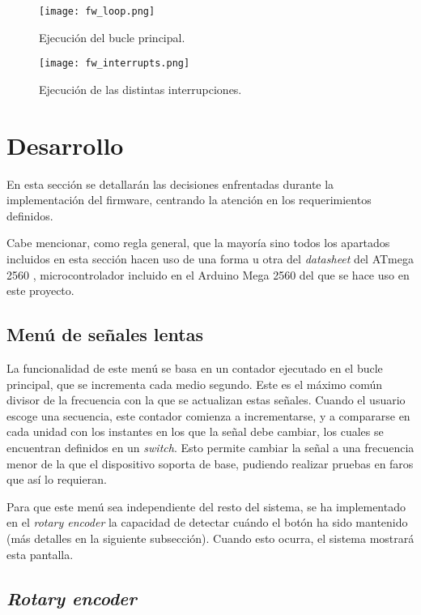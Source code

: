 \begin{figure}[h!]
    \centering
    \texttt{[image: fw\_loop.png]}
    \caption{Ejecución del bucle principal.}
    \label{fig:fw_loop}
\end{figure}

\begin{figure}[h!]
    \centering
    \texttt{[image: fw\_interrupts.png]}
    \caption{Ejecución de las distintas interrupciones.}
    \label{fig:fw_interrupts}
\end{figure}

\section{Desarrollo}

En esta sección se detallarán las decisiones enfrentadas durante la implementación del firmware, centrando la atención en los requerimientos definidos.

Cabe mencionar, como regla general, que la mayoría sino todos los apartados incluidos en esta sección hacen uso de una forma u otra del \textit{datasheet} del ATmega 2560 \cite{atmega2560}, microcontrolador incluido en el Arduino Mega 2560 del que se hace uso en este proyecto.

\subsection{Menú de señales lentas}

La funcionalidad de este menú se basa en un contador ejecutado en el bucle principal, que se incrementa cada medio segundo. Este es el máximo común divisor de la frecuencia con la que se actualizan estas señales. Cuando el usuario escoge una secuencia, este contador comienza a incrementarse, y a compararse en cada unidad con los instantes en los que la señal debe cambiar, los cuales se encuentran definidos en un \textit{switch}. Esto permite cambiar la señal a una frecuencia menor de la que el dispositivo soporta de base, pudiendo realizar pruebas en faros que así lo requieran.

Para que este menú sea independiente del resto del sistema, se ha implementado en el \textit{rotary encoder} la capacidad de detectar cuándo el botón ha sido mantenido (más detalles en la siguiente subsección). Cuando esto ocurra, el sistema mostrará esta pantalla.

\subsection{\textit{Rotary encoder}}

